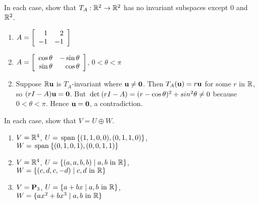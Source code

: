 \begin{multicols}{2}
\begin{ex}
In each case, show that $T_{A} : \mathbb{R}^2 \to \mathbb{R}^2$ has no invariant subspaces except $0$ and $\mathbb{R}^2$.


\begin{enumerate}[label={\alph*.}]
\item $A = \left[ \begin{array}{rr} 1 & 2 \\ -1 & -1 \end{array} \right]$

\item $A = \left[ \begin{array}{rr} \cos \theta & -\sin \theta \\ \sin \theta & \cos \theta \end{array} \right]$, $0 < \theta < \pi$

\end{enumerate}
\begin{sol}
\begin{enumerate}[label={\alph*.}]
\setcounter{enumi}{1}
\item Suppose $\mathbb{R}\textbf{u}$ is $T_{A}$-invariant where $\textbf{u} \neq \textbf{0}$. Then $T_{A}(\textbf{u}) = r\textbf{u}$ for some $r$ in $\mathbb{R}$, so $(rI - A)\textbf{u} = \textbf{0}$. But $\thinspace\operatorname{det\medspace}(rI - A) = (r - \cos \theta)^{2} + sin^{2} \theta \neq 0$ because $0 < \theta < \pi$. Hence $\textbf{u} = \textbf{0}$, a contradiction.

\end{enumerate}
\end{sol}
\end{ex}

\begin{ex}
In each case, show that $V = U \oplus W$.


\begin{enumerate}[label={\alph*.}]
\item $V = \mathbb{R}^4$, $U = \thinspace\operatorname{span\medspace}\{(1, 1, 0, 0), (0, 1, 1, 0)\}$, \\ $W = \thinspace\operatorname{span\medspace}\{(0, 1, 0, 1), (0, 0, 1, 1)\}$

\item $V = \mathbb{R}^4$, $U = \{(a, a, b, b) \mid a, b \mbox{ in }\mathbb{R}\}$, \\ $W = \{(c, d, c, -d) \mid c, d \mbox{ in } \mathbb{R}\}$

\item $V = \textbf{P}_{3}$, $U = \{a + bx \mid a, b \mbox{ in }\mathbb{R}\}$, \\ $W = \{ax^{2} + bx^{3} \mid a, b \mbox{ in } \mathbb{R}\}$


\end{enumerate}
\end{ex}
\end{multicols}
